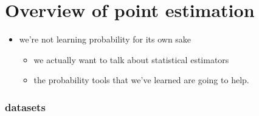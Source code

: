 
\part*{Overview of point estimation}%

\begin{itemize}
\item we're not learning probability for its own sake
\begin{itemize}
\item we actually want to talk about statistical estimators
\item the probability tools that we've learned are going to help.
\end{itemize}
\end{itemize}

\section{datasets}

